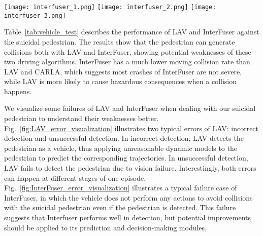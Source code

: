 \documentclass[letterpaper, 10 pt, conference]{ieeeconf}
\begin{document}
\begin{figure*}[tbp]
    \centering
    \texttt{[image: interfuser\_1.png]}
    \hfil
    \texttt{[image: interfuser\_2.png]}
    \hfil
    \texttt{[image: interfuser\_3.png]}
    \caption{Visualization of a failure case of InterFuser in which the AV does not perform any actions to avoid collisions due to failing to predict the trajectory of the pedestrian. We present camera images (top row), detected traffic scenes at the current timestep (middle row) and predicted traffic scenes at the next two timesteps (bottom row). The yellow rectangle in the last two rows represents the ego vehicle, while white rectangles represent other detected objects. Green dots are the future trajectory of the ego vehicle.}
    \label{fig:InterFuser_error_visualization}
\end{figure*}

Table~\ref{tab:vehicle_test} describes the performance of LAV %
and InterFuser %
against the suicidal pedestrian. %
The results show that
the pedestrian can generate collisions both with LAV and InterFuser, showing potential weaknesses of these two driving algorithms. InterFuser has a much lower moving collision rate than LAV and CARLA, which suggests  
most crashes of InterFuser are not severe, while LAV is more likely to cause hazardous consequences when a collision happens.


We visualize some failures of LAV and InterFuser when dealing with our suicidal pedestrian to understand their weaknesses better. Fig.~\ref{fig:LAV_error_visualization} illustrates two typical errors of LAV: incorrect detection and unsuccessful detection. In incorrect detection, LAV detects the pedestrian as a vehicle, thus applying unreasonable dynamic models to the pedestrian to predict the corresponding trajectories. In unsuccessful detection, LAV fails to detect the pedestrian due to vision failure.
Interestingly, both errors can happen at different stages of one episode. Fig.~\ref{fig:InterFuser_error_visualization} illustrates a typical failure case of InterFuser, in which the vehicle does not perform any actions to avoid collisions with the suicidal pedestrian even if the pedestrian is detected. This failure suggests that Interfuser performs well in detection, but potential improvements should be applied to its prediction and decision-making modules.
\end{document}

